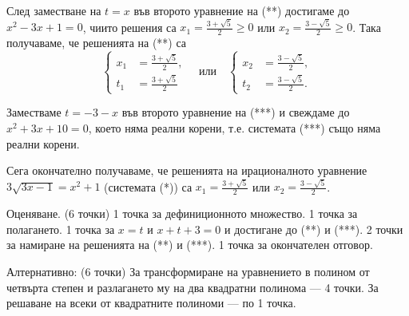След заместване на $t=x$ във второто уравнение на (**) достигаме до $x^{2}-3 x+1=0$, чиито решения са $x_{1}=\frac{3+\sqrt{5}}{2} \geq 0$ или $x_{2}=\frac{3-\sqrt{5}}{2} \geq 0$. Така получаваме, че решенията на (**) са
$$
\left\{
\begin{aligned}
x_{1}&=\frac{3+\sqrt{5}}{2}, \\
t_{1}&=\frac{3+\sqrt{5}}{2}
\end{aligned}
\right.
\quad \text{или} \quad
\left\{
\begin{aligned}
x_{2}&=\frac{3-\sqrt{5}}{2}, \\
t_{2}&=\frac{3-\sqrt{5}}{2}.
\end{aligned}
\right.
$$

Заместваме $t=-3-x$ във второто уравнение на (***) и свеждаме до $x^{2}+3 x+10=0$, което няма реални корени, т.е. системата (***) също няма реални корени.

Сега окончателно получаваме, че решенията на ирационалното уравнение $3 \sqrt{3 x-1}=x^{2}+1$ (системата (*)) са $x_{1}=\frac{3+\sqrt{5}}{2}$ или $x_{2}=\frac{3-\sqrt{5}}{2}$.

Оценяване. (6 точки) 1 точка за дефиниционното множество. 1 точка за полагането. 1 точка за $x=t$ и $x+t+3=0$ и достигане до (**) и (***). 2 точки за намиране на решенията на (**) и (***). 1 точка за окончателен отговор.

Алтернативно: (6 точки) За трансформиране на уравнението в полином от четвърта степен и разлагането му на два квадратни полинома — 4 точки. За решаване на всеки от квадратните полиноми — по 1 точка.
